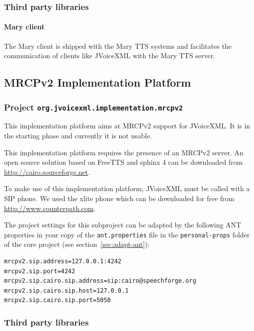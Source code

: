 \documentclass[11pt,a4paper]{article}
\begin{document}
\subsubsection{Third party libraries}
\label{sec:mary-third-party-libr}

\paragraph{Mary client}

The Mary client is shipped with the Mary TTS systems and facilitates the
communication of clients like JVoiceXML with the Mary TTS server.

\subsection{MRCPv2 Implementation Platform}

\subsubsection{Project \texttt{org.jvoicexml.implementation.mrcpv2}}

This implementation platform aims at MRCPv2 support for JVoiceXML. It is in the
starting phase and currently it is not usable.

This implementation platform requires the presence of an MRCPv2 server. An open
source solution based on FreeTTS and sphinx 4 can be downloaded from
\url{http://cairo.sourceforge.net}.

To make use of this implementation platform, JVoiceXML must be called with a SIP
phone. We used the xlite phone which can be downloaded for free from
\url{http://www.counterpath.com}.

The project settings for this subproject can be adapted by the following ANT
properties in your copy of the \texttt{ant.properties} file in the
\texttt{personal-props} folder of the core project (see 
section~\ref{sec:adapt-ant}):
\begin{lstlisting}
mrcpv2.sip.address=127.0.0.1:4242
mrcpv2.sip.port=4242
mrcpv2.sip.cairo.sip.address=sip:cairo@speechforge.org
mrcpv2.sip.cairo.sip.host=127.0.0.1
mrcpv2.sip.cairo.sip.port=5050
\end{lstlisting}

\subsubsection{Third party libraries}
\label{sec:mrcpv2-third-party-libr}
\end{document}
